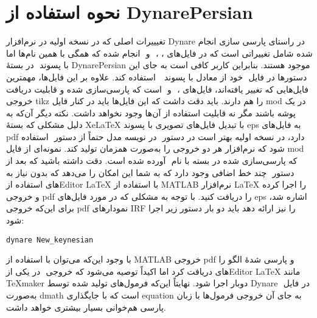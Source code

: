 \documentclass[12pt]{article}
\begin{document}
\section{نحوه استفاده از DynarePersian}
تغیییرات اصلی که در نسخه اولیه در نرم‌افزار Dynare در راستای پارسی سازی انجام شده شامل تغییراتی است که در فایل‌های ‪‬‬، ‪‬‬، ‪‬‬‬‬‬ و ‪‬‬ انجام شده که همگی با همین نام‌ها اما با پسوند ‪‬‬ در بستهٔ DynarePersian موجود هستند. بنابراین کاربر کافی است به جای این دستورها در فایل ‪‬ خود از معادل با پسوند ‬‪‬‬ ‬‬ استفاده کند. علاوه بر این فایل‌ها، مهمترین فایل‌هایی که تغییر یافته‌اند، فایل‌های ‪‬‬، ‪‬‬ و ‪‬‬‬ است که پارسی‌سازی شده و قابلیت دریافت خروجی tikz را هم دارند. باید دقت داشت که این فایل‌ها باید در کنار فایل ‪mod‬‬ در یک پوشه باشند مگر نه قابلیت استفاده از آن‌ها وجود نخواهد داشت. نکته دیگر آن‌که به دلیل مشکلی که بستهٔ ‪XeLaTeX‬‬‬ با تبدیل فایل‌های تصویری با پسوند eps به فایل‌های pdf دارد، در نسخه اولیه بهتر است در دستور ‪‬‬‬ در نویسه مدل حتماً از دستور ‪‬‬‬‬  استفاده شود که نرم‌افزار هر دو خروجی را به‌صورت همزمان تولید کند. نمونه‌ای از فایل ‪mod‬‬‬ که پارسی‌سازی شده در بسته با نام ‪‬‬ آورده شده است. دقت داشته باشید که بعد از دستور ‪‬‬‬ چند خط اضافی وجود دارد که به شما این امکان را می‌دهد که بدون نیاز به استفاده از ‪Editor‬‬های ‪\LaTeX‬‬‬‬ با استفاده از MATLAB نرم‌افزار  ‪\LaTeX‬‬‬‬ را اجرا کرده و خروجی pdf را دریافت کنید. با توجه به مشکلی که در مورد فایل‌های eps اشاره شد، برای این‌که خروجی pdf نمودارهای IRF را نیز ارائه دهد باید دو بار دستور زیر اجرا شود:
 \begin{latin}
\begin{lstlisting}[basicstyle=\scriptsize]
dynare New_keynesian
\end{lstlisting}
\end{latin}
با وجود این‌که می‌توان با استفاده از MATLAB  خروجی pdf و پارسی شدهٔ الگو را دریافت کرد اما اکیداً توصیه می‌شود که خروجی ‪‪‬‬‬‬ در یکی از ‪Editor‬‬‬های ‪\LaTeX‪‬‬‬ مانند TeXmaker دوبار اجرا شود. نهایتاً این‌که فرمول‌های تولید شده توسط Dynare در فایل  ‪‬‬‬‬ ‬‬‬به‌صورت dmath است که با جایگذاری equation به جای آن خروجی فرمول‌ها با زبان پارسی هم‌خوانی بسیار بیشتری خواهد داشت.
\end{document}
